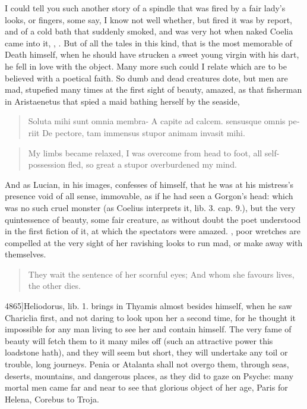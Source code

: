 I could tell you such another story of a spindle that was fired by a
fair lady's looks, or fingers, some say, I know not well whether,
but fired it was by report, and of a cold bath that suddenly smoked,
and was very hot when naked Coelia came into it, , \etc{}. But of all the tales in this kind, that
is the most memorable of Death himself, when he should have
strucken a sweet young virgin with his dart, he fell in love with the
object. Many more such could I relate which are to be believed with a
poetical faith. So dumb and dead creatures dote, but men are mad,
stupefied many times at the first sight of beauty, amazed, as
that fisherman in Aristaenetus that spied a maid bathing herself by the
seaside,

\begin{latin}
\begin{verse}%
Soluta mihi sunt omnia membra-
A capite ad calcem. sensusque omnis periit
De pectore, tam immensus stupor animam invasit mihi.
\end{verse}%
\end{latin}
\translationrule%
\begin{verse}%
My limbs became relaxed,
I was overcome from head to foot, all self-possession fled,
so great a stupor overburdened my mind.
\end{verse}%

And as Lucian, in his images, confesses of himself, that he was
at his mistress's presence void of all sense, immovable, as if he had
seen a Gorgon's head: which was no such cruel monster (as Coelius
interprets it, lib. 3. cap. 9.), but the very quintessence of beauty,
some fair creature, as without doubt the poet understood in the first
fiction of it, at which the spectators were amazed. , poor wretches are compelled at the very sight of her
ravishing looks to run mad, or make away with themselves.

\begin{verse}%
They wait the sentence of her scornful eyes;
And whom she favours lives, the other dies.
\end{verse}%

4865]Heliodorus, lib. 1. brings in Thyamis almost besides himself, when
he saw Chariclia first, and not daring to look upon her a second time,
for he thought it impossible for any man living to see her and contain
himself. The very fame of beauty will fetch them to it many miles off
(such an attractive power this loadstone hath), and they will seem but
short, they will undertake any toil or trouble, long journeys.
Penia or Atalanta shall not overgo them, through seas, deserts,
mountains, and dangerous places, as they did to gaze on Psyche: many
mortal men came far and near to see that glorious object of her age,
Paris for Helena, Corebus to Troja.

